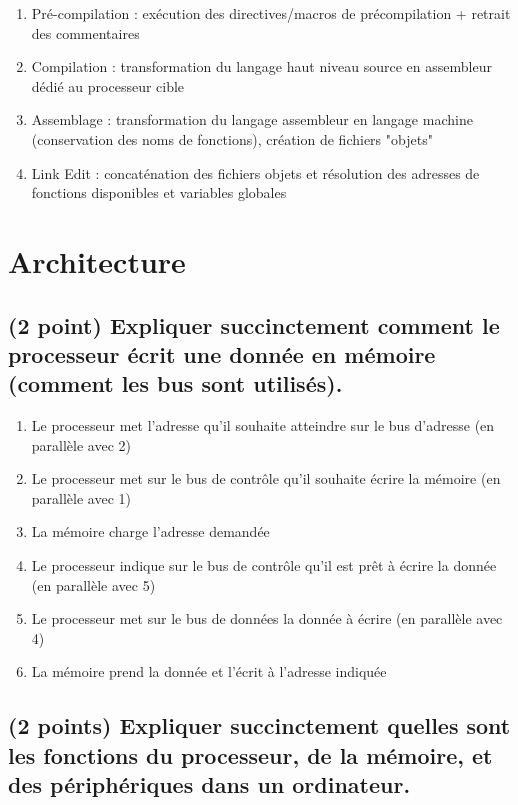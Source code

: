 \documentclass[11pt,a4paper]{article}
\begin{document}
\bigskip
\begin{enumerate}
\item Pré-compilation : exécution des directives/macros de précompilation + retrait des commentaires
\item Compilation : transformation du langage haut niveau source en assembleur dédié au processeur cible
\item Assemblage : transformation du langage assembleur en langage machine (conservation des noms de fonctions), création de fichiers "objets"
\item Link Edit : concaténation des fichiers objets et résolution des adresses de fonctions disponibles et variables globales
\end{enumerate}
\bigskip

\section{Architecture} %

\subsection{(2 point) Expliquer succinctement comment le processeur écrit une donnée en mémoire (comment les bus sont utilisés).}

\bigskip
\begin{enumerate}
\item Le processeur met l'adresse qu'il souhaite atteindre sur le bus d'adresse (en parallèle avec 2)
\item Le processeur met sur le bus de contrôle qu'il souhaite écrire la mémoire (en parallèle avec 1)
\item La mémoire charge l'adresse demandée
\item Le processeur indique sur le bus de contrôle qu'il est prêt à écrire la donnée (en parallèle avec 5)
\item Le processeur met sur le bus de données la donnée à écrire (en parallèle avec 4)
\item La mémoire prend la donnée et l'écrit à l'adresse indiquée
\end{enumerate}
\bigskip

\pagebreak

\subsection{(2 points) Expliquer succinctement quelles sont les fonctions du processeur, de la mémoire, et des périphériques dans un ordinateur.}
\end{document}
